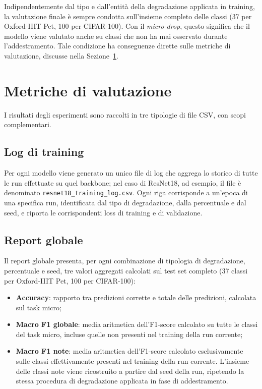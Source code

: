 Indipendentemente dal tipo e dall'entità della degradazione applicata in training, la valutazione finale è sempre condotta sull'insieme completo delle classi (37 per Oxford-IIIT Pet, 100 per CIFAR-100). 
Con il \emph{micro-drop}, questo significa che il modello viene valutato anche su classi che non ha mai osservato durante l'addestramento. Tale condizione ha conseguenze dirette sulle metriche di valutazione, 
discusse nella Sezione~\ref{sec:metriche-valutazione}.

\section{Metriche di valutazione}
\label{sec:metriche-valutazione}

I risultati degli esperimenti sono raccolti in tre tipologie di file CSV, con scopi complementari.

\subsection*{Log di training}

Per ogni modello viene generato un unico file di log che aggrega lo storico di tutte le run effettuate su quel backbone; nel caso di ResNet18, ad esempio, il file è denominato \texttt{resnet18\_training\_log.csv}. 
Ogni riga corrisponde a un'epoca di una specifica run, identificata dal tipo di degradazione, dalla percentuale e dal seed, e riporta le corrispondenti loss di training e di validazione.

\subsection*{Report globale}

Il report globale presenta, per ogni combinazione di tipologia di degradazione, percentuale e seed, tre valori aggregati calcolati sul test set completo (37 classi per Oxford-IIIT Pet, 100 per CIFAR-100):

\begin{itemize}
    \item \textbf{Accuracy}: rapporto tra predizioni corrette e totale delle predizioni, calcolata sul task micro;
    \item \textbf{Macro F1 globale}: media aritmetica dell'F1-score calcolato su tutte le classi del task micro, incluse quelle non presenti nel training della run corrente;
    \item \textbf{Macro F1 note}: media aritmetica dell'F1-score calcolato esclusivamente sulle classi effettivamente presenti nel training della run corrente. 
	L'insieme delle classi note viene ricostruito a partire dal seed della run, ripetendo la stessa procedura di degradazione applicata in fase di addestramento.
\end{itemize}

